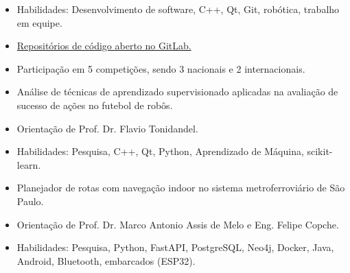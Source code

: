 \documentclass[11pt,a4paper,ragged2e,withhyper]{altacv}
\begin{document}
\begin{paracol}{2}

\begin{itemize}
\item Habilidades: Desenvolvimento de software, C++, Qt, Git, robótica, trabalho em equipe.
\item \href{https://gitlab.com/robofei/ssl}{Repositórios de código aberto no GitLab.}
\item Participação em 5 competições, sendo 3 nacionais e 2 internacionais.
\end{itemize}


\begin{itemize}
\item Análise de técnicas de aprendizado supervisionado aplicadas na avaliação de sucesso de ações no futebol de robôs.
\item Orientação de Prof. Dr. Flavio Tonidandel.
\item Habilidades: Pesquisa, C++, Qt, Python, Aprendizado de Máquina, scikit-learn.
\end{itemize}

\divider

\begin{itemize}
  \item Planejador de rotas com navegação indoor no sistema metroferroviário de São Paulo.
  \item Orientação de Prof. Dr. Marco Antonio Assis de Melo e Eng. Felipe Copche.
  \item Habilidades: Pesquisa, Python, FastAPI, PostgreSQL, Neo4j, Docker, Java, Android, Bluetooth, embarcados (ESP32).
\end{itemize}
  
\medskip




\end{paracol}
\end{document}
